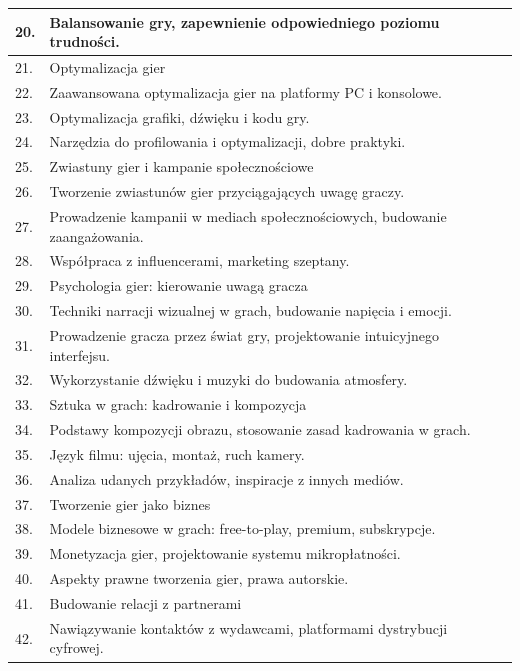 \documentclass[12pt, a4paper]{article}
\begin{document}
\begin{longtable}{|p{1.5cm}|p{6.5cm}|p{6.5cm}|}
  \hline
  20. & Balansowanie gry, zapewnienie odpowiedniego poziomu trudności. &  \\
  \hline
  21. & Optymalizacja gier &  \\
  \hline
  22. & Zaawansowana optymalizacja gier na platformy PC i konsolowe. &  \\
  \hline
  23. & Optymalizacja grafiki, dźwięku i kodu gry. &  \\
  \hline
  24. & Narzędzia do profilowania i optymalizacji, dobre praktyki. &  \\
  \hline
  25. & Zwiastuny gier i kampanie społecznościowe &  \\
  \hline
  26. & Tworzenie zwiastunów gier przyciągających uwagę graczy. &  \\
  \hline
  27. & Prowadzenie kampanii w mediach społecznościowych, budowanie zaangażowania. &  \\
  \hline
  28. & Współpraca z influencerami, marketing szeptany. &  \\
  \hline
  29. & Psychologia gier: kierowanie uwagą gracza &  \\
  \hline
  30. & Techniki narracji wizualnej w grach, budowanie napięcia i emocji. &  \\
  \hline
  31. & Prowadzenie gracza przez świat gry, projektowanie intuicyjnego interfejsu. &  \\
  \hline
  32. & Wykorzystanie dźwięku i muzyki do budowania atmosfery. &  \\
  \hline
  33. & Sztuka w grach: kadrowanie i kompozycja &  \\
  \hline
  34. & Podstawy kompozycji obrazu, stosowanie zasad kadrowania w grach. &  \\
  \hline
  35. & Język filmu: ujęcia, montaż, ruch kamery. &  \\
  \hline
  36. & Analiza udanych przykładów, inspiracje z innych mediów. &  \\
  \hline
  37. & Tworzenie gier jako biznes &  \\
  \hline
  38. & Modele biznesowe w grach: free-to-play, premium, subskrypcje. &  \\
  \hline
  39. & Monetyzacja gier, projektowanie systemu mikropłatności. &  \\
  \hline
  40. & Aspekty prawne tworzenia gier, prawa autorskie. &  \\
  \hline
  41. & Budowanie relacji z partnerami &  \\
  \hline
  42. & Nawiązywanie kontaktów z wydawcami, platformami dystrybucji cyfrowej. &  \\

\end{longtable}
\end{document}
